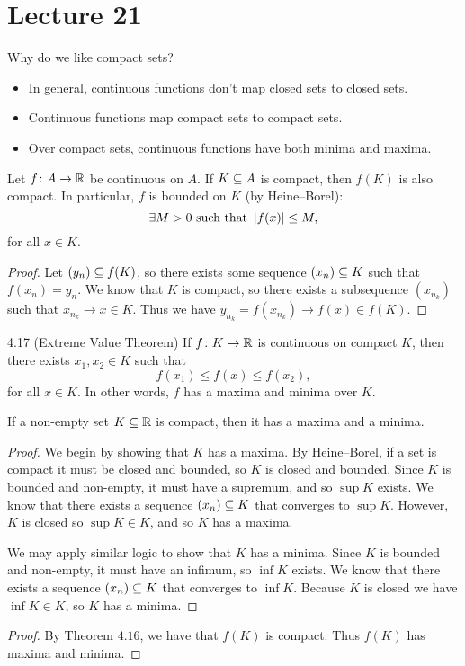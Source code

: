 \documentclass[class=article, crop=false]{standalone}
\begin{document}
  \section{Lecture 21}
  \begin{note}{Why do we like compact sets?}
    \begin{itemize}
      \item In general, continuous functions don't map closed sets to closed sets.
      \item Continuous functions map compact sets to compact sets.
      \item Over compact sets, continuous functions have both minima and maxima.
    \end{itemize}
  \end{note}
  \begin{theorem}{4.16}
    Let $f\colon A\to \mathbb{R}$ be continuous on $A$. If $K\subseteq A$ is compact, then $f(K)$ is also compact. In particular, $f$ is bounded on $K$ (by Heine--Borel):
    \[
      \exists M > 0 \text{ such that } \left\lvert f(x) \right\rvert\leq M,
    \]
    for all $x\in K$.
    \begin{proof}
      Let $(y_n)\subseteq f(K)$, so there exists some sequence $(x_n)\subseteq K$ such that $f(x_n) = y_n$. We know that $K$ is compact, so there exists a subsequence $(x_{n_k})$ such that $x_{n_k}\to x\in K$. Thus we have $y_{n_k} = f(x_{n_k})\to f(x)\in f(K)$.
    \end{proof}
  \end{theorem}
  \begin{theorem}{4.17 (Extreme Value Theorem)}
    If $f\colon K\to \mathbb{R}$ is continuous on compact $K$, then there exists $x_1, x_2\in K$ such that
    \[
      f(x_1) \leq f(x) \leq f(x_2),
    \]
    for all $x\in K$. In other words, $f$ has a maxima and minima over $K$.
    \begin{lemma}{}
      If a non-empty set $K\subseteq\mathbb{R}$ is compact, then it has a maxima and a minima.
      \begin{proof}
        We begin by showing that $K$ has a maxima. By Heine--Borel, if a set is compact it must be closed and bounded, so $K$ is closed and bounded. Since $K$ is bounded and non-empty, it must have a supremum, and so $\sup K$ exists. We know that there exists a sequence $(x_n)\subseteq K$ that converges to $\sup K$. However, $K$ is closed so $\sup K\in K$, and so $K$ has a maxima. \par
        We may apply similar logic to show that $K$ has a minima. Since $K$ is bounded and non-empty, it must have an infimum, so $\inf K$ exists. We know that there exists a sequence $(x_n)\subseteq K$ that converges to $\inf K$. Because $K$ is closed we have $\inf K\in K$, so $K$ has a minima.
      \end{proof}
    \end{lemma}
    \begin{proof}
      By Theorem $4.16$, we have that $f(K)$ is compact. Thus $f(K)$ has maxima and minima.
    \end{proof}
  \end{theorem}
\end{document}
